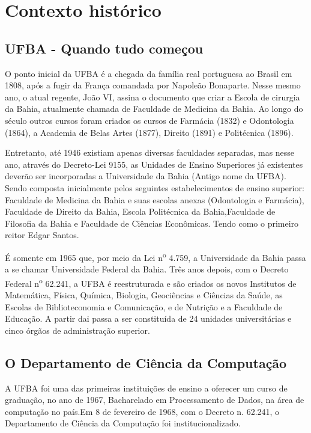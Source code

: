 \chapter{Contexto histórico}
\DoPToC
\newpage
\section{UFBA - Quando tudo começou}
O ponto inicial da UFBA é a chegada da família real portuguesa ao Brasil em 1808, após a fugir da França comandada por Napoleão Bonaparte. Nesse mesmo ano, o atual regente, João VI, assina o documento que criar a Escola de cirurgia da Bahia, atualmente chamada de Faculdade de Medicina da Bahia.  Ao longo do século outros cursos foram criados os cursos de Farmácia (1832) e Odontologia (1864), a Academia de Belas Artes (1877), Direito (1891) e Politécnica (1896).

Entretanto, até 1946 existiam apenas diversas faculdades separadas, mas nesse ano, através do Decreto-Lei 9155, as Unidades de Ensino Superiores já existentes deverão ser incorporadas a Universidade da Bahia (Antigo nome da UFBA). Sendo composta inicialmente pelos seguintes estabelecimentos de ensino superior: Faculdade de Medicina da Bahia e suas escolas anexas (Odontologia e Farmácia), Faculdade de Direito da Bahia, Escola Politécnica da Bahia,Faculdade de Filosofia da Bahia e Faculdade de Ciências Econômicas. Tendo como o primeiro reitor Edgar Santos. 
  
É somente em 1965 que, por meio da Lei n\textsuperscript{o} 4.759, a Universidade da Bahia passa a se chamar Universidade Federal da Bahia. Três anos depois, com o  Decreto Federal n\textsuperscript{o} 62.241, a UFBA é reestruturada e são criados os novos Institutos de Matemática, Física, Química, Biologia, Geociências e Ciências da Saúde, as Escolas de Biblioteconomia e Comunicação, e de Nutrição e a Faculdade de Educação. A partir dai passa a ser constituída de 24 unidades universitárias e cinco órgãos de administração superior.

\section{O Departamento de Ciência da Computação}

A UFBA foi uma das primeiras instituições de ensino a oferecer um curso de graduação, no ano de 1967,  Bacharelado em Processamento de Dados, na área de computação no país.Em 8 de fevereiro de 1968, com o Decreto n. 62.241, o Departamento de Ciência da Computação foi institucionalizado.
 
